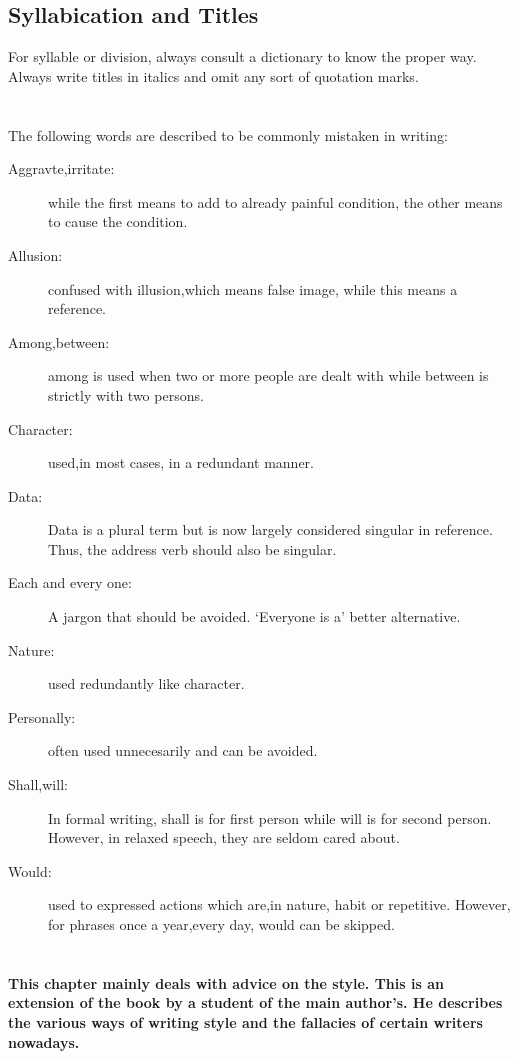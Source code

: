 \documentclass{report}
\begin{document}
\section{Syllabication and Titles}
For syllable or division, always consult a dictionary to know the proper way. Always write titles in italics and omit any sort of quotation marks.



\chapter{}
The following words are described to be commonly mistaken in writing:
\begin{description}
\item[Aggravte,irritate:]while the first means to add to already painful condition, the other means to cause the condition.
\item[Allusion:]confused with illusion,which means false image, while this means a reference.
\item[Among,between:]among is used when two or more people are dealt with while between is strictly with two persons.
\item[Character:]used,in most cases, in a redundant manner.
\item[Data:]Data is a plural term but is now largely considered singular in reference. Thus, the address verb should also be singular.
\item[Each and every one:]A jargon that should be avoided. `Everyone is a' better alternative.
\item[Nature:] used redundantly like character.
\item[Personally:] often used unnecesarily and can be avoided.
\item[Shall,will:] In formal writing, shall is for first person while will is for second person. However, in relaxed speech, they are seldom cared about.
\item[Would:]used to expressed actions which are,in nature, habit or repetitive. However, for phrases once a year,every day, would can be skipped.
\end{description}





\chapter{}
{\bfseries
This chapter mainly deals with advice on the style. This is an extension of the book by a student of the main author's. He describes the various ways of writing style and the fallacies of certain writers nowadays.
}
\end{document}
